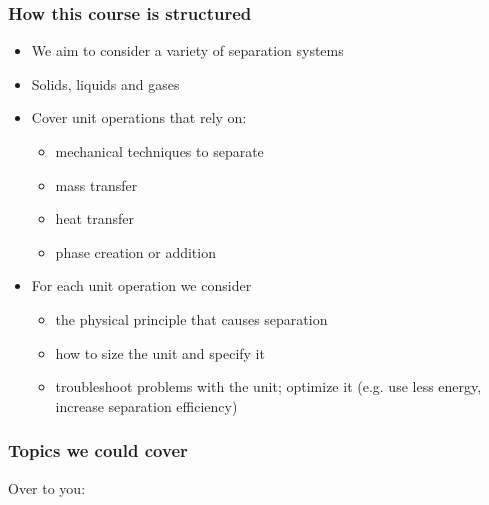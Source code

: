 \begin{frame}\frametitle{How this course is structured}
	\begin{itemize}
		\item	We aim to consider a variety of separation systems
		\item	Solids, liquids and gases
		\item	Cover unit operations that rely on:
		\begin{itemize}
			\item	mechanical techniques to separate
			\item	mass transfer
			\item	heat transfer
			\item	phase creation or addition
		\end{itemize}
		\item	For each unit operation we consider
		\begin{itemize}
			\item	the physical principle that causes separation
			\item	how to size the unit and specify it
			\item	troubleshoot problems with the unit; optimize it (e.g. use less energy, increase separation efficiency)
			
		\end{itemize}
	\end{itemize}
\end{frame}

\begin{frame}\frametitle{Topics we could cover}
	Over to you:
\end{frame}
